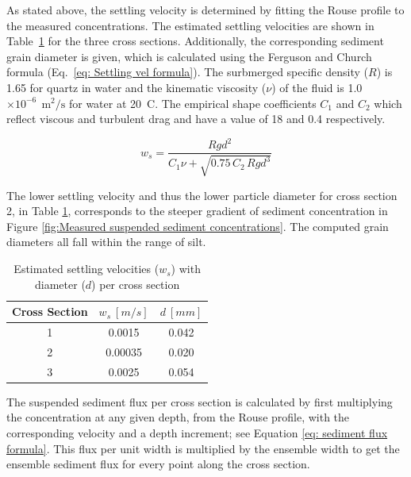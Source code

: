 As stated above, the settling velocity is determined by fitting the Rouse profile to the measured concentrations. 
The estimated settling velocities are shown in Table~\ref{tab: Overview settling velocity} for the three cross sections. 
Additionally, the corresponding sediment grain diameter is given, which is calculated using the Ferguson and Church \autocite{fergusonSimpleUniversalEquation2004} formula (Eq.~\ref{eq: Settling vel formula}). The surbmerged specific density ($R$) is 1.65 for quartz in water and the kinematic viscosity ($\nu$) of the fluid is 1.0 $\times 10^{-6}~\ \text{m}^2\text{/s}$ for water at 20~\textdegree C. The empirical shape coefficients $C_1$ and $C_2$ which reflect viscous and turbulent drag and have a value of 18 and 0.4 respectively.

\begin{equation}
    w_s = \frac{R g d^2}{C_1 \nu + \sqrt{0.75\, C_2\, R g d^3}}
    \label{eq: Settling vel formula}
\end{equation}

The lower settling velocity and thus the lower particle diameter for cross section 2, in Table \ref{tab: Overview settling velocity}, corresponds to the steeper gradient of sediment concentration in Figure \ref{fig:Measured suspended sediment concentrations}. The computed grain diameters all fall within the range of silt.  

\begin{table}[H]
    \centering
    \caption{Estimated settling velocities ($w_s$) with diameter ($d$) per cross section}
    \label{tab: Overview settling velocity}
    \setlength{\tabcolsep}{8pt}
    \begin{tabular}{c c c}
        \hline
        Cross Section & $w_s~[m/s]$ & $d~[mm]$  \\
        \hline
        1 & 0.0015 &  0.042 \\
        2 & 0.00035  &  0.020 \\
        3 & 0.0025 & 0.054 \\
        \hline
    \end{tabular}
\end{table}

The suspended sediment flux per cross section is calculated by first multiplying the concentration at any given depth, from the Rouse profile, with the corresponding velocity and a depth increment; see Equation \ref{eq: sediment flux formula}. This flux per unit width is multiplied by the ensemble width to get the ensemble sediment flux for every point along the cross section. 

